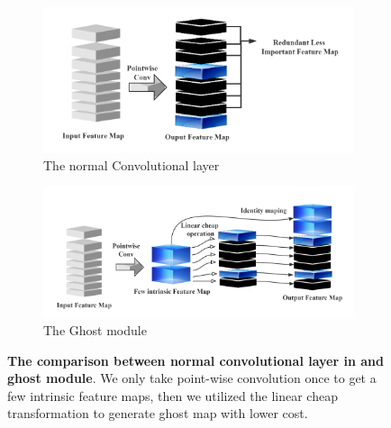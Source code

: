 \begin{figure}[h]
	\begin{center}
		\begin{subfigure}[b]{0.49\textwidth}
			\includegraphics[width=\textwidth]{thesis-template-master/images/normal conv.png}
			\caption{The normal Convolutional layer}
			\label{fig:res18}
		\end{subfigure}
		\begin{subfigure}[b]{0.49\textwidth}
		    \centering
			\includegraphics[width=\textwidth]{thesis-template-master/images/ghostmodule.png}
			\caption{The Ghost module}
			\label{fig:cellnet}
		\end{subfigure}
	\end{center}
	\caption{\textbf{The comparison between normal convolutional layer in \cite{b26}\cite{b27}\cite{b28} and ghost module}. We only take point-wise convolution once to get a few intrinsic feature maps, then we utilized the linear cheap transformation to generate ghost map with lower cost.}
\end{figure}



